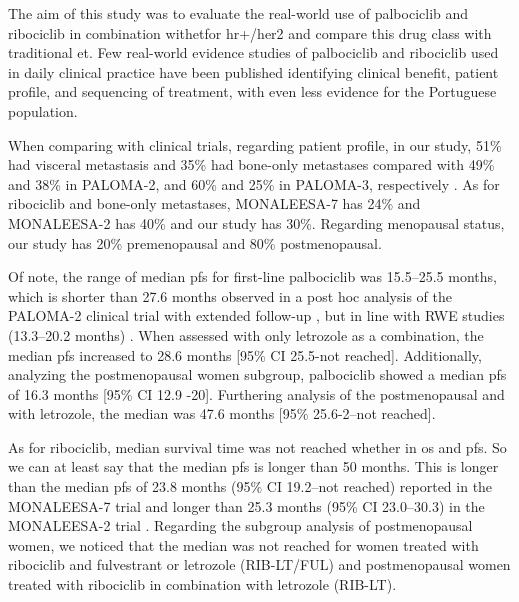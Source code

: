 The aim of this study was to evaluate the real-world use of palbociclib and ribociclib in combination with\ac{et}for \ac{hr+}/\ac{her2} and compare this drug class with traditional \ac{et}. Few real-world evidence studies of palbociclib and ribociclib used in daily clinical practice have been published identifying clinical benefit, patient profile, and sequencing of treatment, with even less evidence for the Portuguese population.

When comparing with clinical trials, regarding patient profile, in our study, 51\% had visceral metastasis and 35\% had bone-only metastases compared with 49\% and 38\% in PALOMA-2, and 60\% and 25\% in PALOMA-3, respectively \cite{rugoImpactPalbociclibLetrozole2018,cristofanilliFulvestrantPalbociclibFulvestrant2016a}.
As for ribociclib and bone-only metastases, MONALEESA-7 \cite{tripathyRibociclibEndocrineTherapy2018} has 24\% and MONALEESA-2 has 40\% \cite{hortobagyiUpdatedResultsMONALEESA22018} and our study has 30\%. Regarding menopausal status, our study has 20\% premenopausal and 80\% postmenopausal. 



Of note, the range of median \ac{pfs} for first-line palbociclib was 15.5–25.5 months, which is shorter than 27.6 months observed in a post hoc analysis of the PALOMA-2 clinical trial with extended follow-up \cite{rugoImpactPalbociclibLetrozole2018}, but in line with RWE studies (13.3–20.2 months) \cite{harbeckCDK4InhibitorsHR2021}. When assessed with only letrozole as a combination, the median \ac{pfs} increased to 28.6 months [95\% CI 25.5-not reached]. Additionally, analyzing the postmenopausal women subgroup, palbociclib showed a median \ac{pfs} of 16.3 months [95\% CI 12.9 -20]. Furthering analysis of the postmenopausal and with letrozole, the median was 47.6 months [95\% 25.6-2–not reached].

As for ribociclib, median survival time was not reached whether in \ac{os} and \ac{pfs}. So we can at least say that the median \ac{pfs} is longer than 50 months. This is longer than the median \ac{pfs} of 23.8 months (95\% CI 19.2–not reached) reported in the MONALEESA-7 trial \cite{tripathyRibociclibEndocrineTherapy2018} and longer than  25.3 months (95\% CI 23.0–30.3) in the MONALEESA-2 trial \cite{hortobagyiUpdatedResultsMONALEESA22018}. Regarding the subgroup analysis of postmenopausal women, we noticed that the median was not reached for women treated with ribociclib and fulvestrant or letrozole (RIB-LT/FUL) and postmenopausal women treated with ribociclib in combination with letrozole (RIB-LT).

